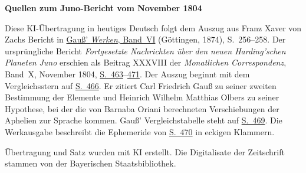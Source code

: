\clearpage\thispagestyle{empty}
\begin{center}\textbf{Quellen zum Juno-Bericht vom November 1804}\end{center}
\noindent Diese KI-Übertragung in heutiges Deutsch folgt dem Auszug aus Franz Xaver von Zachs Bericht in \href{https://gdz.sub.uni-goettingen.de/id/PPN236007467}{Gauß’ \textit{Werken}, Band~VI} (Göttingen, 1874), S.~256--258. Der ursprüngliche Bericht \textit{Fortgesetzte Nachrichten über den neuen Harding’schen Planeten Juno} erschien als Beitrag XXXVIII der \textit{Monatlichen Correspondenz}, Band~X, November 1804, \href{https://www.digitale-sammlungen.de/en/view/bsb10538602?page=477}{S.~463}--\href{https://www.digitale-sammlungen.de/en/view/bsb10538602?page=485}{471}. Der Auszug beginnt mit dem Vergleichsstern auf \href{https://www.digitale-sammlungen.de/en/view/bsb10538602?page=480}{S.~466}. Er zitiert Carl Friedrich Gauß zu seiner zweiten Bestimmung der Elemente und Heinrich Wilhelm Matthias Olbers zu seiner Hypothese, bei der die von Barnaba Oriani berechneten Verschiebungen der Aphelien zur Sprache kommen. Gauß’ Vergleichstabelle steht auf \href{https://www.digitale-sammlungen.de/en/view/bsb10538602?page=483}{S.~469}. Die Werkausgabe beschreibt die Ephemeride von \href{https://www.digitale-sammlungen.de/en/view/bsb10538602?page=484}{S.~470} in eckigen Klammern.
\par\smallskip\noindent Übertragung und Satz wurden mit KI erstellt. Die Digitalisate der Zeitschrift stammen von der Bayerischen Staatsbibliothek.
\clearpage

